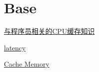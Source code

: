 
\section{Base}
\label{chap:base}

\href{https://coolshell.cn/articles/20793.html/comment-page-2#comments}{与程序员相关的CPU缓存知识}

\href{https://colin-scott.github.io/personal_website/research/interactive_latency.html}{latency}

\href{https://www.ecs.csun.edu/~cputnam/Comp546/Putnam/Cache%20Memory.pdf}{Cache Memory}

